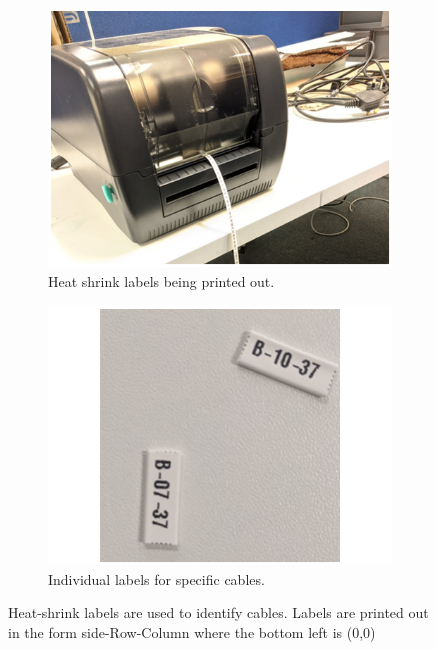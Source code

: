 \begin{figure}[htbp]
\centering
\begin{subfigure}{.5\textwidth}
  \centering
  \includegraphics[width=\linewidth]{Chapter3/Figs/Raster/detCon018b_HeatLabelsPrinted.png}
  \captionsetup{width=.9\linewidth}
  \caption{Heat shrink labels being printed out.}
  \label{subFig:detCon018b_HeatLabelsPrinted}
\end{subfigure}%
\begin{subfigure}{.5\textwidth}
  \centering
  \includegraphics[width=\linewidth]{Chapter3/Figs/Raster/detCon019b_CutLabels.png}
  \captionsetup{width=.9\linewidth}
  \caption{Individual labels for specific cables.}
  \label{subFig:detCon019b_CutLabels}
\end{subfigure}
\caption{Heat-shrink labels are used to identify cables. Labels are printed out in the form side-Row-Column where the bottom left is (0,0) }
\label{fig:detCon_HeatLabelsPrinted_CutLabels}
\end{figure}

